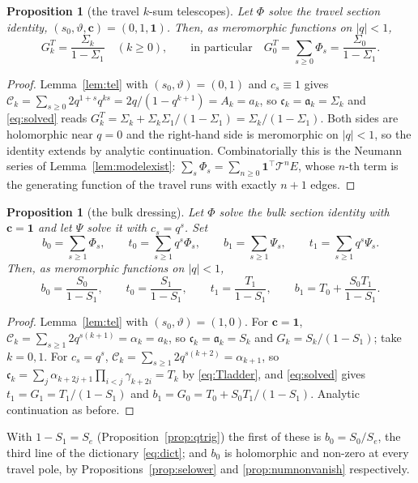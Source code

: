 \documentclass[11pt]{article}
\theoremstyle{plain}
\newtheorem{proposition}[theorem]{Proposition}
\theoremstyle{definition}
\theoremstyle{remark}
\begin{document}
\begin{proposition}[the travel $k$-sum telescopes]\label{prop:travelsum}
Let $\Phi$ solve the travel section identity, $(s_0,\vartheta,\mathbf c)=(0,1,\mathbf 1)$. Then, as
meromorphic functions on $|q|<1$,
\[
  G^{T}_k=\frac{\Sigma_k}{1-\Sigma_1}\quad(k\ge0),\qquad\text{in particular}\quad
  G^{T}_0=\sum_{s\ge0}\Phi_s=\frac{\Sigma_0}{1-\Sigma_1} .
\]
\end{proposition}

\begin{proof}
Lemma~\ref{lem:tel} with $(s_0,\vartheta)=(0,1)$ and $c_s\equiv1$ gives
$\mathcal C_k=\sum_{s\ge0}2q^{1+s}q^{ks}=2q/(1-q^{k+1})=A_k=a_k$, so
$\mathfrak c_k=\mathfrak a_k=\Sigma_k$ and \eqref{eq:solved} reads
$G^T_k=\Sigma_k+\Sigma_k\Sigma_1/(1-\Sigma_1)=\Sigma_k/(1-\Sigma_1)$. Both sides are holomorphic
near $q=0$ and the right-hand side is meromorphic on $|q|<1$, so the identity extends by analytic
continuation. Combinatorially this is the Neumann series of Lemma~\ref{lem:modelexist}:
$\sum_s\Phi_s=\sum_{n\ge0}\mathbf 1^{\!\top}\mathcal T^nE$, whose $n$-th term is the generating
function of the travel runs with exactly $n+1$ edges.
\end{proof}

\begin{proposition}[the bulk dressing]\label{prop:bulkdress}
Let $\Phi$ solve the bulk section identity with $\mathbf c=\mathbf 1$ and let $\Psi$ solve it with
$c_s=q^s$. Set
\[
  b_0=\sum_{s\ge1}\Phi_s,\qquad t_0=\sum_{s\ge1}q^s\Phi_s,\qquad
  b_1=\sum_{s\ge1}\Psi_s,\qquad t_1=\sum_{s\ge1}q^s\Psi_s .
\]
Then, as meromorphic functions on $|q|<1$,
\[
  b_0=\frac{S_0}{1-S_1},\qquad t_0=\frac{S_1}{1-S_1},\qquad
  t_1=\frac{T_1}{1-S_1},\qquad b_1=T_0+\frac{S_0T_1}{1-S_1}.
\]
\end{proposition}

\begin{proof}
Lemma~\ref{lem:tel} with $(s_0,\vartheta)=(1,0)$. For $\mathbf c=\mathbf 1$,
$\mathcal C_k=\sum_{s\ge1}2q^{s(k+1)}=\alpha_k=a_k$, so $\mathfrak c_k=\mathfrak a_k=S_k$ and
$G_k=S_k/(1-S_1)$; take $k=0,1$. For $c_s=q^s$,
$\mathcal C_k=\sum_{s\ge1}2q^{s(k+2)}=\alpha_{k+1}$, so
$\mathfrak c_k=\sum_j\alpha_{k+2j+1}\prod_{i<j}\gamma_{k+2i}=T_k$ by \eqref{eq:Tladder}, and
\eqref{eq:solved} gives $t_1=G_1=T_1/(1-S_1)$ and $b_1=G_0=T_0+S_0T_1/(1-S_1)$. Analytic
continuation as before.
\end{proof}

\noindent With $1-S_1=S_e$ (Proposition~\ref{prop:qtrig}) the first of these is $b_0=S_0/S_e$, the
third line of the dictionary \eqref{eq:dict}; and $b_0$ is holomorphic and non-zero at every travel
pole, by Propositions~\ref{prop:selower} and \ref{prop:numnonvanish} respectively.
\end{document}
